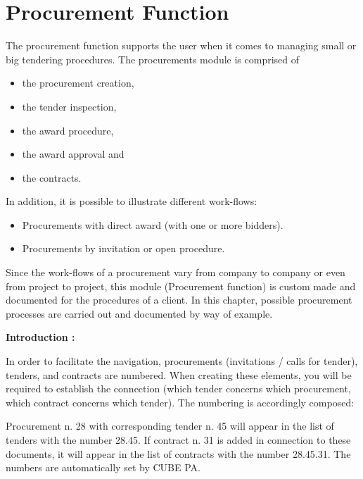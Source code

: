 
\clearpage
\section{Procurement Function}

The procurement function supports the user when it comes to managing small or big tendering procedures. The procurements module is comprised of

\begin{itemize}
\item the procurement creation,
\item the tender inspection,
\item the award procedure,
\item the award approval and
\item the contracts.
\end{itemize}

\vspace{\baselineskip}

In addition, it is possible to illustrate different work-flows:

\begin{itemize}
\item Procurements with direct award (with one or more bidders).
\item Procurements by invitation or open procedure.
\end{itemize}

\vspace{\baselineskip}

Since the work-flows of a procurement vary from company to company or even from project to project, this module (Procurement function) is custom made and documented for the procedures of a client. In this chapter, possible procurement processes are carried out and documented by way of example.

\vspace{\baselineskip}

\textbf{Introduction :}

In order to facilitate the navigation, procurements (invitations / calls for tender), tenders, and contracts are numbered. When creating these elements, you will be required to establish the connection (which tender concerns which procurement, which contract concerns which tender). The numbering is accordingly composed:

\vspace{\baselineskip}

Procurement n. 28 with corresponding tender n. 45 will appear in the list of tenders with the number 28.45. If contract n. 31 is added in connection to these documents, it will appear in the list of contracts with the number 28.45.31. The numbers are automatically set by CUBE PA.

